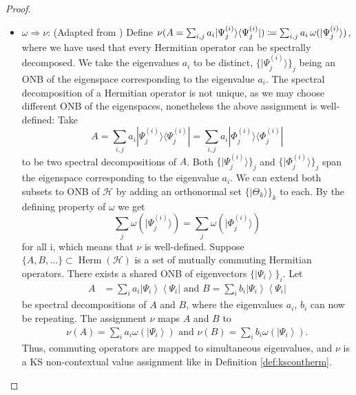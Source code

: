 \begin{proof}
\begin{itemize}
\item $\omega\Rightarrow\nu$: (Adapted from \cite{Pusey2019}) Define $\nu(A=\sum_{i,j}a_{i}|\Psi_{j}^{(i)}\rangle\langle\Psi_{j}^{(i)}|)\coloneqq\sum_{i,j}a_{i}\thinspace\omega(|\Psi_{j}^{(i)}\rangle)$, where we have used that every Hermitian operator can be spectrally decomposed. We take the eigenvalues $a_{i}$ to be distinct, $\{|\Psi_{j}^{(i)}\rangle\}_{j}$ being an ONB of the eigenspace corresponding to the eigenvalue $a_{i}$. The spectral decomposition of a Hermitian operator is not unique, as we may choose different ONB of the eigenspaces, nonetheless the above assignment is well-defined: Take
\begin{equation*}
    A=\sum_{i,j}a_{i}|\Psi_{j}^{(i)}\rangle\langle\Psi_{j}^{(i)}|=\sum_{i,j}a_{i}|\Phi_{j}^{(i)}\rangle\langle\Phi_{j}^{(i)}|
\end{equation*}
to be two spectral decompositions of $A$. Both $\{|\Psi_{j}^{(i)}\rangle\}_{j}$ and $\{|\Phi_{j}^{(i)}\rangle\}_{j}$ span the eigenspace corresponding to the eigenvalue $a_{i}$. We can extend both subsets to ONB of $\mathcal{H}$ by adding an orthonormal set $\{|\Theta_{k}\rangle\}_{k}$ to each. By the defining property of $\omega$ we get
\begin{equation*}
    \sum_{j}\omega(|\Psi_{j}^{(i)}\rangle)=\sum_{j}\omega(|\Phi_{j}^{(i)}\rangle)
\end{equation*} 
for all i, which means that $\nu$ is well-defined. Suppose $\{A,B,...\}\subset\operatorname{Herm}(\mathcal{H})$ is a set of mutually commuting Hermitian operators. There exists a shared ONB of eigenvectors $\{\left|\Psi_{i}\right\rangle \}_{i}$. Let 
\begin{align*}
    A & =\sum_{i}a_{i}\left|\Psi_{i}\right\rangle \left\langle \Psi_{i}\right| \text{ and } B =\sum_{i}b_{i}\left|\Psi_{i}\right\rangle \left\langle \Psi_{i}\right|
\end{align*}
be spectral decompositions of $A$ and $B$, where the eigenvalues $a_{i}$, $b_{i}$ can now be repeating. The assignment $\nu$ maps $A$ and $B$ to
\begin{align*}
    \nu(A) =\sum_{i}a_{i}\omega(\left|\Psi_{i}\right\rangle ) \text{ and } \nu(B)  =\sum_{i}b_{i}\omega(\left|\Psi_{i}\right\rangle ).
\end{align*}
Thus, commuting operators are mapped to simultaneous eigenvalues, and $\nu$ is a KS non-contextual value assignment like in Definition \ref{def:kscontherm}.
\end{itemize}
\end{proof}

